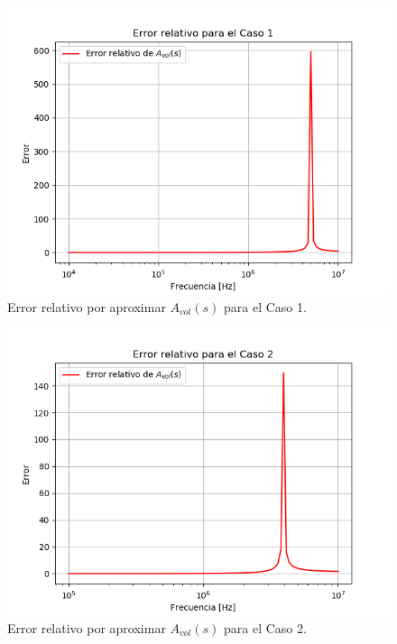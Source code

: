 \begin{figure}[H]	
	\centering
	\includegraphics[width=\textwidth]{Ejercicio1/Imagenes/error1_noinv.png}
	\caption{Error relativo por aproximar $A_{vol}(s)$ para el Caso 1.}
\end{figure}
\begin{figure}[H]	
	\centering
	\includegraphics[width=\textwidth]{Ejercicio1/Imagenes/error2_noinv.png}
	\caption{Error relativo por aproximar $A_{vol}(s)$ para el Caso 2.}
\end{figure}
